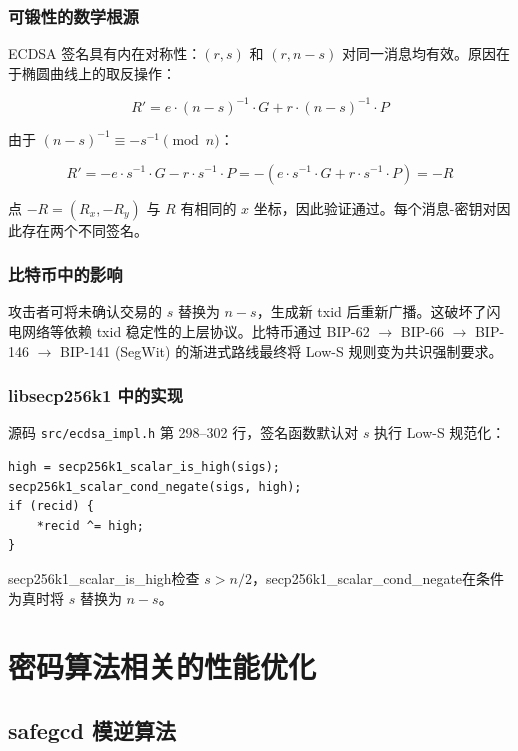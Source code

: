 \documentclass[a4paper,12pt]{ctexart}
\begin{document}
\subsubsection{可锻性的数学根源}

ECDSA 签名具有内在对称性：$(r, s)$ 和 $(r, n-s)$ 对同一消息均有效。原因在于椭圆曲线上的取反操作：

$$R' = e \cdot (n-s)^{-1} \cdot G + r \cdot (n-s)^{-1} \cdot P$$

由于 $(n-s)^{-1} \equiv -s^{-1} \pmod{n}$：

$$R' = -e \cdot s^{-1} \cdot G - r \cdot s^{-1} \cdot P = -(e \cdot s^{-1} \cdot G + r \cdot s^{-1} \cdot P) = -R$$

点 $-R = (R_x, -R_y)$ 与 $R$ 有相同的 $x$ 坐标，因此验证通过。每个消息-密钥对因此存在两个不同签名。

\subsubsection{比特币中的影响}

攻击者可将未确认交易的 $s$ 替换为 $n-s$，生成新 txid 后重新广播。这破坏了闪电网络等依赖 txid 稳定性的上层协议。比特币通过 BIP-62 $\to$ BIP-66 $\to$ BIP-146 $\to$ BIP-141 (SegWit) 的渐进式路线最终将 Low-S 规则变为共识强制要求。

\subsubsection{libsecp256k1 中的实现}

源码 \texttt{src/ecdsa\_impl.h} 第 298--302 行，签名函数默认对 $s$ 执行 Low-S 规范化：

\begin{codebox}
\begin{verbatim}
high = secp256k1_scalar_is_high(sigs);
secp256k1_scalar_cond_negate(sigs, high);
if (recid) {
    *recid ^= high;
}
\end{verbatim}
\end{codebox}

secp256k1\_scalar\_is\_high检查 $s > n/2$，secp256k1\_scalar\_cond\_negate在条件为真时将 $s$ 替换为 $n-s$。

\section{密码算法相关的性能优化}
\subsection{safegcd 模逆算法}
\end{document}
